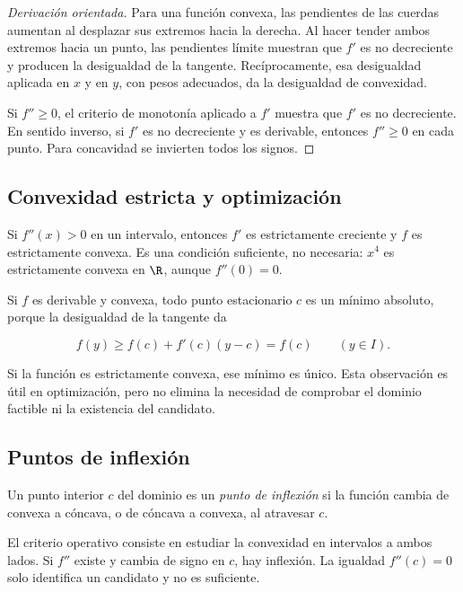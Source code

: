 \begin{proof}[Derivación orientada]
Para una función convexa, las pendientes de las cuerdas aumentan al desplazar
sus extremos hacia la derecha. Al hacer tender ambos extremos hacia un punto,
las pendientes límite muestran que \(f'\) es no decreciente y producen la
desigualdad de la tangente. Recíprocamente, esa desigualdad aplicada en \(x\)
y en \(y\), con pesos adecuados, da la desigualdad de convexidad.

Si \(f''\ge0\), el criterio de monotonía aplicado a \(f'\) muestra que \(f'\)
es no decreciente. En sentido inverso, si \(f'\) es no decreciente y es
derivable, entonces \(f''\ge0\) en cada punto. Para concavidad se invierten
todos los signos.
\end{proof}

\subsection{Convexidad estricta y optimización}

Si \(f''(x)>0\) en un intervalo, entonces \(f'\) es estrictamente creciente y
\(f\) es estrictamente convexa. Es una condición suficiente, no necesaria:
\(x^4\) es estrictamente convexa en \(\R\), aunque \(f''(0)=0\).

Si \(f\) es derivable y convexa, todo punto estacionario \(c\) es un mínimo
absoluto, porque la desigualdad de la tangente da

\[
  f(y)\ge f(c)+f'(c)(y-c)=f(c)
  \qquad(y\in I).
\]

Si la función es estrictamente convexa, ese mínimo es único. Esta observación
es útil en optimización, pero no elimina la necesidad de comprobar el dominio
factible ni la existencia del candidato.

\subsection{Puntos de inflexión}

\begin{definicion}
Un punto interior \(c\) del dominio es un \emph{punto de inflexión} si la
función cambia de convexa a cóncava, o de cóncava a convexa, al atravesar
\(c\).
\end{definicion}

El criterio operativo consiste en estudiar la convexidad en intervalos a
ambos lados. Si \(f''\) existe y cambia de signo en \(c\), hay inflexión. La
igualdad \(f''(c)=0\) solo identifica un candidato y no es suficiente.

